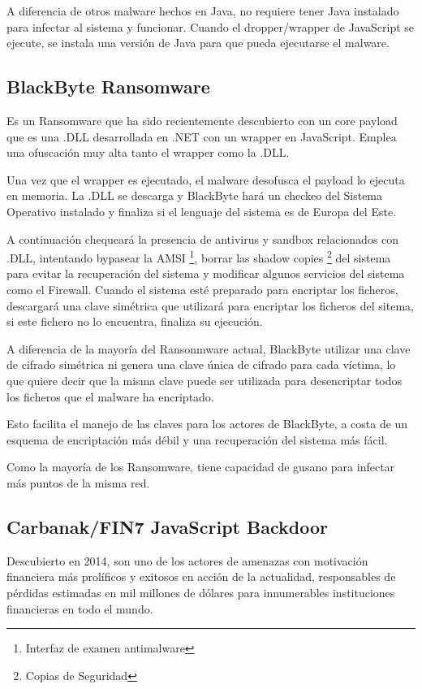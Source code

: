 \documentclass[15pt]{article}
\begin{document}
	A diferencia de otros malware hechos en Java, no requiere tener Java instalado para infectar al sistema y funcionar. Cuando el dropper/wrapper de JavaScript se ejecute, se instala una versión de Java para que pueda ejecutarse el malware.	
	

	\subsection{BlackByte Ransomware}
	Es un Ransomware que ha sido recientemente descubierto con un core payload que es una .DLL desarrollada en .NET con un wrapper en JavaScript. Emplea una ofuscación muy alta tanto el wrapper como la .DLL.
	
	Una vez que el wrapper es ejecutado, el malware desofusca el payload lo ejecuta en memoria. La .DLL se descarga y BlackByte hará un checkeo del Sistema Operativo instalado y finaliza si el lenguaje del sistema es de Europa del Este.
	
	A continuación chequeará la presencia de antivirus y sandbox relacionados con .DLL, intentando bypasear la AMSI \footnote{Interfaz de examen antimalware}, borrar las shadow copies \footnote{Copias de Seguridad} del sistema para evitar la recuperación del sistema y modificar algunos servicios del sistema como el Firewall. Cuando el sistema esté preparado para encriptar los ficheros, descargará una clave simétrica que utilizará para encriptar los ficheros del sitema, si este fichero no lo encuentra, finaliza su ejecución.
	
	A diferencia de la mayoría del Ransonmware actual, BlackByte utilizar una clave de cifrado simétrica ni genera una clave única de cifrado para cada víctima, lo que quiere decir que la misma clave puede ser utilizada para desencriptar todos los ficheros que el malware ha encriptado.
	
	Esto facilita el manejo de las claves para los actores de BlackByte, a costa de un esquema de encriptación más débil y una recuperación del sistema más fácil.
	
	Como la mayoría de los Ransomware, tiene capacidad de gusano para infectar más puntos de la misma red.
	
	
	\subsection{Carbanak/FIN7 JavaScript Backdoor}
	Descubierto en 2014, son uno de los actores de amenazas con motivación financiera más prolíficos y exitosos en acción de la actualidad, responsables de pérdidas estimadas en mil millones de dólares para innumerables instituciones financieras en todo el mundo.
	
\end{document}
